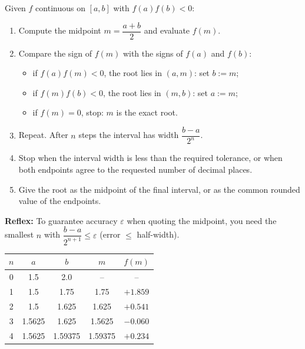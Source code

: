 \documentclass[11pt]{article}
\begin{document}
\begin{methode}
Given $f$ continuous on $[a,b]$ with $f(a)f(b)<0$:
\begin{enumerate}
\item Compute the midpoint $m=\dfrac{a+b}{2}$ and evaluate $f(m)$.
\item Compare the sign of $f(m)$ with the signs of $f(a)$ and $f(b)$:
\begin{itemize}
\item if $f(a)f(m)<0$, the root lies in $(a,m)$: set $b:=m$;
\item if $f(m)f(b)<0$, the root lies in $(m,b)$: set $a:=m$;
\item if $f(m)=0$, stop: $m$ is the exact root.
\end{itemize}
\item Repeat. After $n$ steps the interval has width $\dfrac{b-a}{2^{n}}$.
\item Stop when the interval width is less than the required tolerance, or when both endpoints agree to the requested number of decimal places.
\item Give the root as the midpoint of the final interval, or as the common rounded value of the endpoints.
\end{enumerate}
\textbf{Reflex:} To guarantee accuracy $\varepsilon$ when quoting the midpoint, you need the smallest $n$ with $\dfrac{b-a}{2^{n+1}}\leq \varepsilon$ (error $\leq$ half-width).
\end{methode}

\begin{exemplebox}[{Bisection iteration table for $x^3+2x-7=0$ on $[1.5,2]$}]
\begin{center}
\begin{tabular}{|c|c|c|c|c|}\hline
$n$ & $a$ & $b$ & $m$ & $f(m)$ \\ \hline
0 & 1.5 & 2.0 & -- & -- \\
1 & 1.5 & 1.75 & 1.75 & $+1.859$ \\
2 & 1.5 & 1.625 & 1.625 & $+0.541$ \\
3 & 1.5625 & 1.625 & 1.5625 & $-0.060$ \\
4 & 1.5625 & 1.59375 & 1.59375 & $+0.234$ \\ \hline
\end{tabular}
\end{center}
\end{exemplebox}
\end{document}
